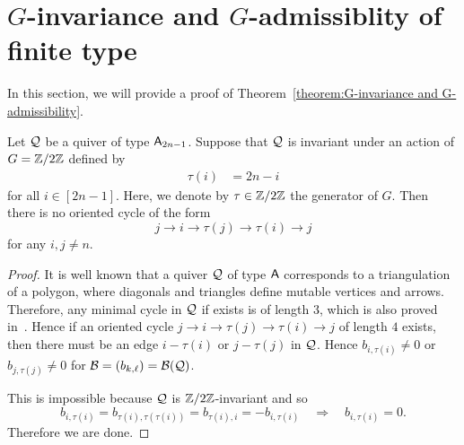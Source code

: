 \section{\texorpdfstring{$G$}{G}-invariance and \texorpdfstring{$G$}{G}-admissiblity of finite type}
\label{section:invariance and admissibility}

In this section, we will provide a proof of Theorem~\ref{theorem:G-invariance and G-admissibility}. 
\begin{lemma}\label{lemma:no weird cycles in An}
Let $\mathcal{Q}$ be a quiver of type $\mathsf{A}_{2n-1}$.
Suppose that $\mathcal{Q}$ is invariant under an action of $G = \mathbb{Z}/2\mathbb{Z}$ defined by 
\begin{align*}
\tau(i)&=2n-i
\end{align*}
for all $i\in[2n-1]$. Here, we denote by $\tau \in \mathbb{Z}/2\mathbb{Z}$ the generator of $G$.
Then there is no oriented cycle of the form
\[
j\to i\to\tau(j)\to\tau(i)\to j
\]
for any $i,j\neq n$.
\end{lemma}
\begin{proof}
It is well known that a quiver $\mathcal{Q}$ of type $\mathsf{A}$ corresponds to a triangulation of a polygon, where diagonals and triangles define mutable vertices and arrows.
Therefore, any minimal cycle in $\mathcal{Q}$ if exists is of length $3$, which is also proved in~\cite[\S2]{BuanVatne08}.
Hence if an oriented cycle $j\to i\to\tau(j)\to\tau(i)\to j$ of length $4$ exists, then there must be an edge $i-\tau(i)$ or $j-\tau(j)$ in $\mathcal{Q}$. Hence $b_{i,\tau(i)}\neq0$ or $b_{j,\tau(j)}\neq0$ for $\mathcal{B}=(b_{k,\ell})=\mathcal{B}(\mathcal{Q})$.

This is impossible because $\mathcal{Q}$ is $\mathbb{Z}/2\mathbb{Z}$-invariant and so
\[
b_{i,\tau(i)} = b_{\tau(i),\tau(\tau(i))} = b_{\tau(i), i} = -b_{i,\tau(i)}\quad\Longrightarrow\quad
b_{i,\tau(i)}=0.
\]
Therefore we are done.
\end{proof}



